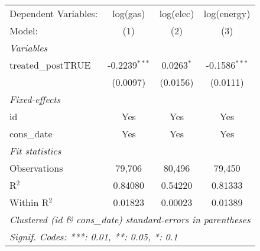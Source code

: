 
\begin{tabular}{lccc}
   \tabularnewline\midrule\midrule
   Dependent Variables: & log(gas)        & log(elec)    & log(energy)\\
   Model:               & (1)             & (2)          & (3)\\
   \midrule \emph{Variables} &   &   &  \\
   treated\_postTRUE   & -0.2239$^{***}$ & 0.0263$^{*}$ & -0.1586$^{***}$\\
                        & (0.0097)        & (0.0156)     & (0.0111)\\
   \midrule \emph{Fixed-effects} &   &   &  \\
   id                   & Yes             & Yes          & Yes\\
   cons\_date          & Yes             & Yes          & Yes\\
   \midrule \emph{Fit statistics} &   &   &  \\
   Observations         & 79,706          & 80,496       & 79,450\\
   R$^2$                & 0.84080         & 0.54220      & 0.81333\\
   Within R$^2$         & 0.01823         & 0.00023      & 0.01389\\
   \midrule\midrule\multicolumn{4}{l}{\emph{Clustered (id \& cons\_date) standard-errors in parentheses}}\\
   \multicolumn{4}{l}{\emph{Signif. Codes: ***: 0.01, **: 0.05, *: 0.1}}\\
\end{tabular}


